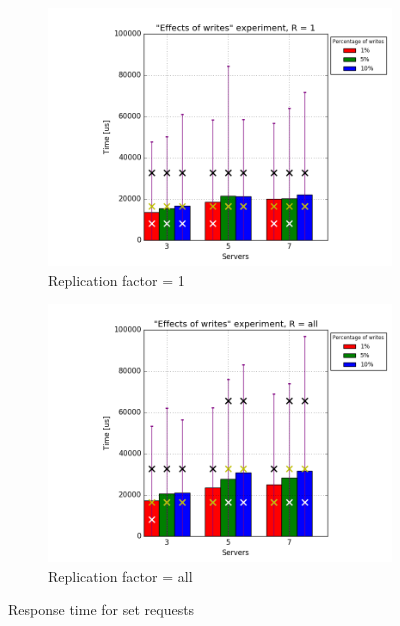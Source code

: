 \documentclass[11pt]{article}
\begin{document}
\begin{figure}
\centering
\begin{subfigure}{.5\textwidth}
	\centering
	\includegraphics[width=\linewidth]{plots/writes-response_time-set-1-replication}
	\caption{Replication factor = 1}
	\label{fig:writes-set-1}
\end{subfigure}%
\begin{subfigure}{.5\textwidth}
	\centering
	\includegraphics[width=\linewidth]{plots/writes-response_time-set-2-replication}
	\caption{Replication factor = all}
	\label{fig:writes-set-2}
\end{subfigure}
\caption{Response time for set requests}
\label{fig:writes-response-time-set}
\end{figure}
\end{document}
